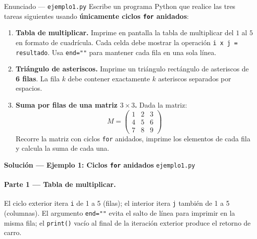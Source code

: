 \documentclass[12pt,a4paper]{article}
\begin{document}
\vspace{0.8em}
\begin{enunciadobox}{Enunciado — \texttt{ejemplo1.py}}
Escribe un programa Python que realice las tres tareas siguientes
usando \textbf{únicamente ciclos \texttt{for} anidados}:

\begin{enumerate}
  \item \textbf{Tabla de multiplicar.}
        Imprime en pantalla la tabla de multiplicar del $1$ al $5$ en formato de cuadrícula.
        Cada celda debe mostrar la operación \texttt{i x j = resultado}.
        Usa \texttt{end=""} para mantener cada fila en una sola línea.

  \item \textbf{Triángulo de asteriscos.}
        Imprime un triángulo rectángulo de asteriscos de \textbf{6 filas}.
        La fila $k$ debe contener exactamente $k$ asteriscos separados por espacios.

  \item \textbf{Suma por filas de una matriz $3 \times 3$.}
        Dada la matriz:
        \[
          M = \begin{pmatrix} 1 & 2 & 3 \\ 4 & 5 & 6 \\ 7 & 8 & 9 \end{pmatrix}
        \]
        Recorre la matriz con ciclos \texttt{for} anidados, imprime los elementos
        de cada fila y calcula la suma de cada una.
\end{enumerate}
\end{enunciadobox}

\newpage
\begin{solucionbanner}
  {\large\bfseries\color{solColor} Solución — Ejemplo 1: Ciclos \texttt{for} anidados}
  \hfill \texttt{ejemplo1.py}
\end{solucionbanner}

\vspace{0.8em}


\vspace{0.8em}
\paragraph{Parte 1 — Tabla de multiplicar.}
El ciclo exterior itera \texttt{i} de 1 a 5 (filas); el interior itera
\texttt{j} también de 1 a 5 (columnas). El argumento \texttt{end=""} evita
el salto de línea para imprimir en la misma fila; el \texttt{print()} vacío
al final de la iteración exterior produce el retorno de carro.
\end{document}
